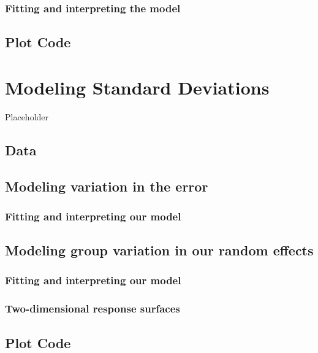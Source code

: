 \documentclass[
]{book}
\begin{document}
\hypertarget{fitting-and-interpreting-the-model}{%
\subsection{Fitting and interpreting the model}\label{fitting-and-interpreting-the-model}}

\hypertarget{plot-code-8}{%
\section{Plot Code}\label{plot-code-8}}

\hypertarget{modeling-standard-deviations}{%
\chapter{Modeling Standard Deviations}\label{modeling-standard-deviations}}

Placeholder

\hypertarget{data}{%
\section{Data}\label{data}}

\hypertarget{modeling-variation-in-the-error}{%
\section{Modeling variation in the error}\label{modeling-variation-in-the-error}}

\hypertarget{fitting-and-interpreting-our-model}{%
\subsection{Fitting and interpreting our model}\label{fitting-and-interpreting-our-model}}

\hypertarget{modeling-group-variation-in-our-random-effects}{%
\section{Modeling group variation in our random effects}\label{modeling-group-variation-in-our-random-effects}}

\hypertarget{fitting-and-interpreting-our-model-1}{%
\subsection{Fitting and interpreting our model}\label{fitting-and-interpreting-our-model-1}}

\hypertarget{two-dimensional-response-surfaces}{%
\subsection{Two-dimensional response surfaces}\label{two-dimensional-response-surfaces}}

\hypertarget{plot-code-9}{%
\section{Plot Code}\label{plot-code-9}}
\end{document}
